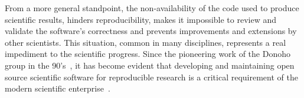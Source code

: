 From a more general standpoint, the non-availability of the code
used to produce scientific results, hinders reproducibility,
makes it impossible to review and validate the software's correctness
and prevents improvements and extensions by other scientists.
This situation, common in many disciplines,
represents a real impediment to the scientific progress.
Since the pioneering work of the Donoho group in the 90's~\cite{Buckheit_1995},
it has become evident that developing and maintaining open source scientific software
for reproducible research is a critical requirement of the modern
scientific enterprise~\cite{Ince_2012,Vihinen_2015}.


